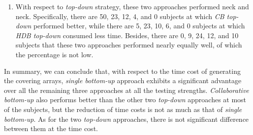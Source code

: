 \documentclass[conference]{IEEEtran}
\theoremstyle{definition}
\begin{document}
\begin{enumerate}
 \item  With respect to \emph{top-down} strategy, these two approaches performed neck and neck. Specifically, there are 50, 23, 12, 4, and 0 subjects at which \emph{CB top-down} performed better, while there are 5, 23, 10, 6, and 0 subjects at which \emph{HDB top-down} consumed less time. Besides, there are 0, 9, 24, 12, and 10 subjects that these two approaches performed nearly equally well, of which the percentage is not low.

\end{enumerate}



In summary, we can conclude that, with respect to the time cost of generating the covering arrays, \emph{single bottom-up} approach exhibits a significant advantage over all the remaining three approaches at all the testing strengths. \emph{Collaborative bottom-up} also performs better than the other two \emph{top-down} approaches at most of the subjects, but the reduction of time costs is not as much as that of \emph{single bottom-up}. As for the two \emph{top-down} approaches, there is not significant difference between them at the time cost.


\end{document}
